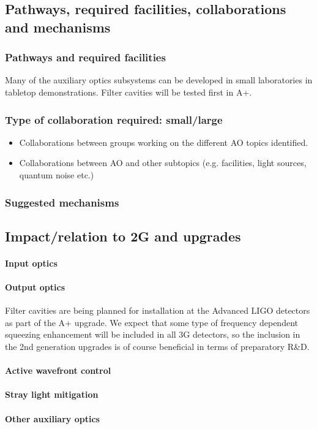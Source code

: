 \subsection{Pathways, required facilities, collaborations and mechanisms}

\subsubsection{Pathways and required facilities}
Many of the auxiliary optics subsystems can be developed in small laboratories in tabletop demonstrations. Filter cavities will be tested first in A+. 

\subsubsection{Type of collaboration required:  small/large}
\begin{itemize}
\item Collaborations between groups working on the different AO topics identified. 
\item Collaborations between AO and other subtopics (e.g. facilities, light sources, quantum noise etc.)
\end{itemize}
\subsubsection{Suggested mechanisms}

\subsection{Impact/relation to 2G and upgrades}
\paragraph{Input optics}


\paragraph{Output optics}
Filter cavities are being planned for installation at the Advanced LIGO detectors as part of the A+ upgrade. We expect that some type of frequency dependent squeezing enhancement will be included in all 3G detectors, so the inclusion in the 2nd generation upgrades is of course beneficial in terms of preparatory R\&D.

\paragraph{Active wavefront control}
\paragraph{Stray light mitigation}
\paragraph{Other auxiliary optics}